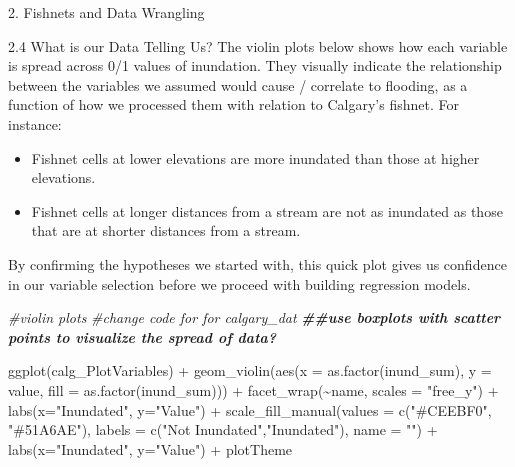 \documentclass[
  ignorenonframetext,
]{beamer}
\newenvironment{Shaded}{\begin{snugshade}}{\end{snugshade}}
\newcommand{\AttributeTok}[1]{\textcolor[rgb]{0.77,0.63,0.00}{#1}}
\newcommand{\CommentTok}[1]{\textcolor[rgb]{0.56,0.35,0.01}{\textit{#1}}}
\newcommand{\DocumentationTok}[1]{\textcolor[rgb]{0.56,0.35,0.01}{\textbf{\textit{#1}}}}
\newcommand{\FunctionTok}[1]{\textcolor[rgb]{0.00,0.00,0.00}{#1}}
\newcommand{\NormalTok}[1]{#1}
\newcommand{\SpecialCharTok}[1]{\textcolor[rgb]{0.00,0.00,0.00}{#1}}
\newcommand{\StringTok}[1]{\textcolor[rgb]{0.31,0.60,0.02}{#1}}
\begin{document}
\begin{frame}[fragile]{2. Fishnets and Data Wrangling}
\begin{block}{2.4 What is our Data Telling Us?}
The violin plots below shows how each variable is spread across 0/1
values of inundation. They visually indicate the relationship between
the variables we assumed would cause / correlate to flooding, as a
function of how we processed them with relation to Calgary's fishnet.
For instance:

\begin{itemize}
\item
  Fishnet cells at lower elevations are more inundated than those at
  higher elevations.
\item
  Fishnet cells at longer distances from a stream are not as inundated
  as those that are at shorter distances from a stream.
\end{itemize}

By confirming the hypotheses we started with, this quick plot gives us
confidence in our variable selection before we proceed with building
regression models.

\begin{Shaded}
\begin{Highlighting}[]
\CommentTok{\#violin plots}
\CommentTok{\#change code for for calgary\_dat}
\DocumentationTok{\#\#use boxplots with scatter points to visualize the spread of data?}

\FunctionTok{ggplot}\NormalTok{(calg\_PlotVariables) }\SpecialCharTok{+} 
     \FunctionTok{geom\_violin}\NormalTok{(}\FunctionTok{aes}\NormalTok{(}\AttributeTok{x =} \FunctionTok{as.factor}\NormalTok{(inund\_sum), }
                  \AttributeTok{y =}\NormalTok{ value, }\AttributeTok{fill =} \FunctionTok{as.factor}\NormalTok{(inund\_sum))) }\SpecialCharTok{+} 
     \FunctionTok{facet\_wrap}\NormalTok{(}\SpecialCharTok{\textasciitilde{}}\NormalTok{name, }\AttributeTok{scales =} \StringTok{"free\_y"}\NormalTok{) }\SpecialCharTok{+}
     \FunctionTok{labs}\NormalTok{(}\AttributeTok{x=}\StringTok{"Inundated"}\NormalTok{, }\AttributeTok{y=}\StringTok{"Value"}\NormalTok{) }\SpecialCharTok{+} 
     \FunctionTok{scale\_fill\_manual}\NormalTok{(}\AttributeTok{values =} \FunctionTok{c}\NormalTok{(}\StringTok{"\#CEEBF0"}\NormalTok{, }\StringTok{"\#51A6AE"}\NormalTok{),}
     \AttributeTok{labels =} \FunctionTok{c}\NormalTok{(}\StringTok{"Not Inundated"}\NormalTok{,}\StringTok{"Inundated"}\NormalTok{), }\AttributeTok{name =} \StringTok{""}\NormalTok{) }\SpecialCharTok{+}
     \FunctionTok{labs}\NormalTok{(}\AttributeTok{x=}\StringTok{"Inundated"}\NormalTok{, }\AttributeTok{y=}\StringTok{"Value"}\NormalTok{) }\SpecialCharTok{+} 
\NormalTok{  plotTheme}
\end{Highlighting}
\end{Shaded}


\end{block}
\end{frame}
\end{document}

